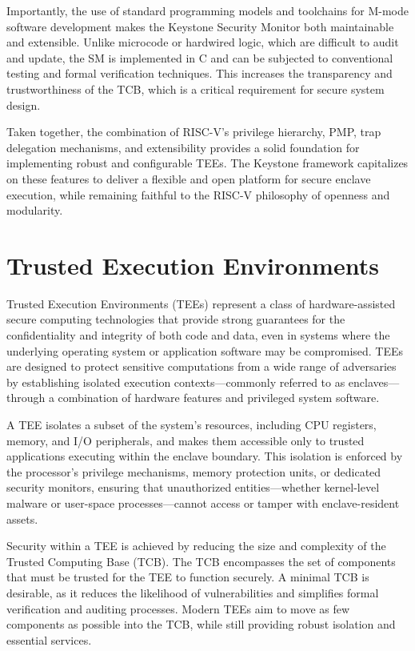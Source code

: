 Importantly, the use of standard programming models and toolchains for M-mode software development makes the Keystone Security Monitor both maintainable and extensible. Unlike microcode or hardwired logic, which are difficult to audit and update, the SM is implemented in C and can be subjected to conventional testing and formal verification techniques. This increases the transparency and trustworthiness of the TCB, which is a critical requirement for secure system design.

Taken together, the combination of RISC-V’s privilege hierarchy, PMP, trap delegation mechanisms, and extensibility provides a solid foundation for implementing robust and configurable TEEs. The Keystone framework capitalizes on these features to deliver a flexible and open platform for secure enclave execution, while remaining faithful to the RISC-V philosophy of openness and modularity.

\section{Trusted Execution Environments}
Trusted Execution Environments (TEEs) represent a class of hardware-assisted secure computing technologies that provide strong guarantees for the confidentiality and integrity of both code and data, even in systems where the underlying operating system or application software may be compromised. TEEs are designed to protect sensitive computations from a wide range of adversaries by establishing isolated execution contexts—commonly referred to as enclaves—through a combination of hardware features and privileged system software.

A TEE isolates a subset of the system’s resources, including CPU registers, memory, and I/O peripherals, and makes them accessible only to trusted applications executing within the enclave boundary. This isolation is enforced by the processor’s privilege mechanisms, memory protection units, or dedicated security monitors, ensuring that unauthorized entities—whether kernel-level malware or user-space processes—cannot access or tamper with enclave-resident assets.

Security within a TEE is achieved by reducing the size and complexity of the Trusted Computing Base (TCB). The TCB encompasses the set of components that must be trusted for the TEE to function securely. A minimal TCB is desirable, as it reduces the likelihood of vulnerabilities and simplifies formal verification and auditing processes. Modern TEEs aim to move as few components as possible into the TCB, while still providing robust isolation and essential services.

